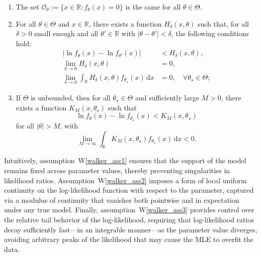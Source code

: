 \documentclass[11pt,twoside]{article}
\newcommand{\Wref}[1]{W\ref{#1}}
\def\RR{\mathbb{R}}
\begin{document}
\begin{enumerate}
    \renewcommand{\labelenumi}{W\arabic{enumi}.}
    \item \label{walker_ass1}
    The set $\mathcal O_\theta := \{x \in \RR : f_\theta(x) = 0\}$ is the same for all $\theta \in \Theta$.
    
    \item \label{walker_ass2}
    For all $\theta \in \Theta$ and $x \in \RR$, there exists a function $H_\delta(x, \theta)$ such that, for all $\delta > 0$ small enough and all $\theta' \in \RR$ with $|\theta - \theta'| < \delta$, the following conditions hold:
    \begin{align*}
        |\ln f_\theta(x) - \ln f_{\theta'}(x)| &< H_\delta(x, \theta), \\
        \lim_{\delta \to 0} H_\delta(x, \theta) &= 0, \\
        \lim_{\delta \to 0} \int_\RR H_\delta(x, \theta) f_{\theta_\star}(x)\, \mathrm dx &= 0, \quad \forall \theta_\star \in \Theta;
    \end{align*}
    
    \item \label{walker_ass3}
    If $\Theta$ is unbounded, then for all $\theta_\star \in \Theta$ and sufficiently large $M > 0$, there exists a function $K_M(x, \theta_\star)$ such that
    \begin{equation*}
        \ln f_\theta(x) - \ln f_{\theta_\star}(x) < K_M(x, \theta_\star)
    \end{equation*}
    for all $|\theta| > M$, with
    \begin{equation*}
        \lim_{M \to \infty} \int_\RR K_M(x, \theta_\star) f_{\theta_\star}(x)\, \mathrm dx < 0.
    \end{equation*}
\end{enumerate}






Intuitively, assumption~\Wref{walker_ass1} ensures that the support of the model remains fixed across parameter values, thereby preventing singularities in likelihood ratios. Assumption~\Wref{walker_ass2} imposes a form of local uniform continuity on the log-likelihood function with respect to the parameter, captured via a modulus of continuity that vanishes both pointwise and in expectation under any true model. Finally, assumption~\Wref{walker_ass3} provides control over the relative tail behavior of the log-likelihood, requiring that log-likelihood ratios decay sufficiently fast---in an integrable manner---as the parameter value diverges, avoiding arbitrary peaks of the likelihood that may cause the MLE to overfit the data.
\end{document}
